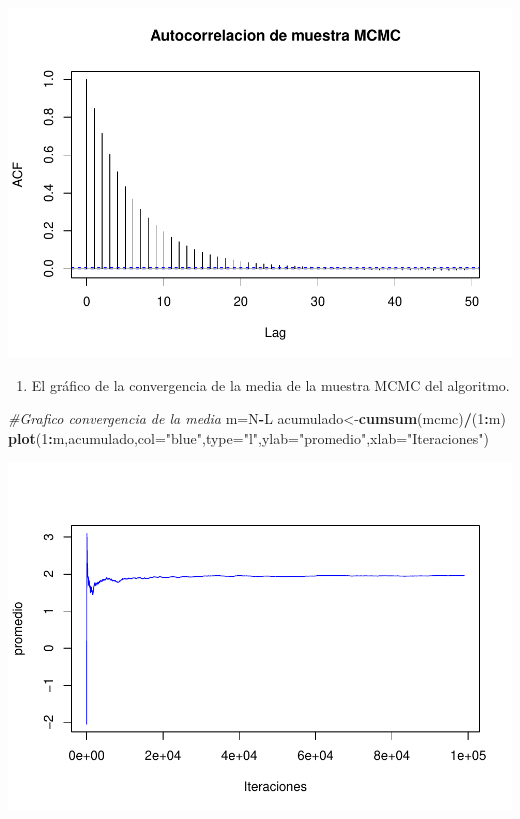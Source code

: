 \documentclass[
]{article}
\newenvironment{Shaded}{\begin{snugshade}}{\end{snugshade}}
\newcommand{\AttributeTok}[1]{\textcolor[rgb]{0.13,0.29,0.53}{#1}}
\newcommand{\CommentTok}[1]{\textcolor[rgb]{0.56,0.35,0.01}{\textit{#1}}}
\newcommand{\DecValTok}[1]{\textcolor[rgb]{0.00,0.00,0.81}{#1}}
\newcommand{\FunctionTok}[1]{\textcolor[rgb]{0.13,0.29,0.53}{\textbf{#1}}}
\newcommand{\NormalTok}[1]{#1}
\newcommand{\OtherTok}[1]{\textcolor[rgb]{0.56,0.35,0.01}{#1}}
\newcommand{\SpecialCharTok}[1]{\textcolor[rgb]{0.81,0.36,0.00}{\textbf{#1}}}
\newcommand{\StringTok}[1]{\textcolor[rgb]{0.31,0.60,0.02}{#1}}
\providecommand{\tightlist}{%
  \setlength{\itemsep}{0pt}\setlength{\parskip}{0pt}}
\begin{document}
\includegraphics{tarea2_files/figure-latex/unnamed-chunk-26-1.pdf}

\begin{enumerate}
\def\labelenumi{\alph{enumi}.}
\setcounter{enumi}{5}
\tightlist
\item
  El gráfico de la convergencia de la media de la muestra MCMC del
  algoritmo.
\end{enumerate}

\begin{Shaded}
\begin{Highlighting}[]
\CommentTok{\#Grafico convergencia de la media}
\NormalTok{m}\OtherTok{=}\NormalTok{N}\SpecialCharTok{{-}}\NormalTok{L}
\NormalTok{acumulado}\OtherTok{\textless{}{-}}\FunctionTok{cumsum}\NormalTok{(mcmc)}\SpecialCharTok{/}\NormalTok{(}\DecValTok{1}\SpecialCharTok{:}\NormalTok{m)}
\FunctionTok{plot}\NormalTok{(}\DecValTok{1}\SpecialCharTok{:}\NormalTok{m,acumulado,}\AttributeTok{col=}\StringTok{"blue"}\NormalTok{,}\AttributeTok{type=}\StringTok{"l"}\NormalTok{,}\AttributeTok{ylab=}\StringTok{"promedio"}\NormalTok{,}\AttributeTok{xlab=}\StringTok{"Iteraciones"}\NormalTok{)}
\end{Highlighting}
\end{Shaded}

\includegraphics{tarea2_files/figure-latex/unnamed-chunk-27-1.pdf}
\end{document}
